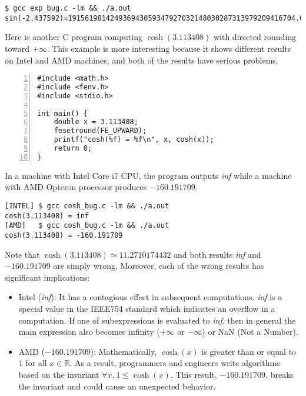 \documentclass{llncs}
\begin{document}
\begin{Verbatim}[frame=single, fontsize=\relsize{-1}]
$ gcc exp_bug.c -lm && ./a.out
sin(-2.437592)=191561981424936943059347927032148030287313979209416704.00
\end{Verbatim}

Here is another C program computing $\cosh(3.113408)$ with directed
rounding toward $+\infty$. This example is more interesting because it
shows different results on Intel and AMD machines, and both of the
results have serious problems.

\begin{Verbatim}[numbers=left, frame=single, fontsize=\relsize{-1}]
#include <math.h>
#include <fenv.h>
#include <stdio.h>

int main() {
    double x = 3.113408;
    fesetround(FE_UPWARD);
    printf("cosh(%f) = %f\n", x, cosh(x));
    return 0;
}
\end{Verbatim}

In a machine with Intel Core i7 CPU, the program outputs
\textit{inf} while a machine with AMD Opteron processor produces
$-160.191709$.

\begin{Verbatim}[frame=single, fontsize=\relsize{-1}]
[INTEL] $ gcc cosh_bug.c -lm && ./a.out
cosh(3.113408) = inf
[AMD]   $ gcc cosh_bug.c -lm && ./a.out
cosh(3.113408) = -160.191709
\end{Verbatim}

Note that $\cosh(3.113408) \simeq 11.2710174432$ and both results
\textit{inf} and $-160.191709$ are simply wrong. Moreover, each of the
wrong results has significant implications:

\begin{itemize}
\item Intel (\textit{inf}): It has a contagious effect in subsequent
  computations. \textit{inf} is a special value in the IEEE754
  standard which indicates an overflow in a computation. If one of
  subexpressions is evaluated to \textit{inf}, then in general the
  main expression also becomes infinity ($+\infty$ or $-\infty$) or
  NaN (Not a Number).
\item AMD ($-160.191709$): Mathematically, $\cosh(x)$ is greater than or
  equal to $1$ for all $x \in \mathbb{R}$. As a result, programmers
  and engineers write algorithms based on the invariant $\forall x. \
  1 \le \cosh(x)$. This result, $-160.191709$, breaks the invariant
  and could cause an unexpected behavior.
\end{itemize}
\end{document}
